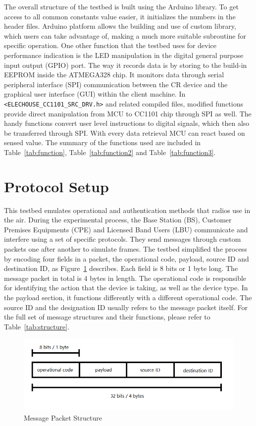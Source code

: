 The overall structure of the testbed is built using the Arduino library. To get access to all common constants value easier, 
it initializes the numbers in the header files. Arduino platform allows the building and use of custom library, which users can take advantage
of, making a much more suitable subroutine for specific operation. One other function that the testbed uses for device performance indication 
is the LED manipulation in the digital general purpose input output (GPIO) port. The way it records data is by storing to the build-in
EEPROM inside the ATMEGA328 chip. It monitors data through 
serial peripheral interface (SPI) communication between the CR device and the graphical user interface (GUI) within the client machine.
In \texttt{<ELECHOUSE\_CC1101\_SRC\_DRV.h>} and related compiled files, modified functions provide direct manipulation from MCU 
to CC1101 chip through SPI as well. The handy functions convert user level instructions to digital signals, which then also be transferred 
through SPI. With every data retrieval MCU can react based on sensed value. The summary of the functions used are included in
Table~\ref{tab:function}, Table~\ref{tab:function2} and Table~\ref{tab:function3}.

\section{Protocol Setup}

This testbed emulates operational and authentication methods that radios use in the air. During the experimental process, 
the Base Station (BS), Customer Premises Equipments (CPE) and Licensed Band Users (LBU) communicate and interfere using 
a set of specific protocols. They send messages through custom packets one after another to simulate frames. The testbed simplified 
the process by encoding four fields in a packet, the operational code, payload, source ID and destination ID, as Figure~\ref{fig:packet} describes. 
Each field is 8 bits or 1 byte long. The message packet in total is 4 bytes in length. The operational code is responsible for identifying the 
action that the device is taking, as well as the device type. In the payload section, it functions differently with a different operational code.
The source ID and the designation ID usually refers to the message packet itself. For the full set of message structures and their functions, 
please refer to Table~\ref{tab:structure}.


\begin{figure}[ht]
\centering
\includegraphics[width=12cm]{figures/packet.png}
\caption{Message Packet Structure}
\label{fig:packet}
\end{figure}

